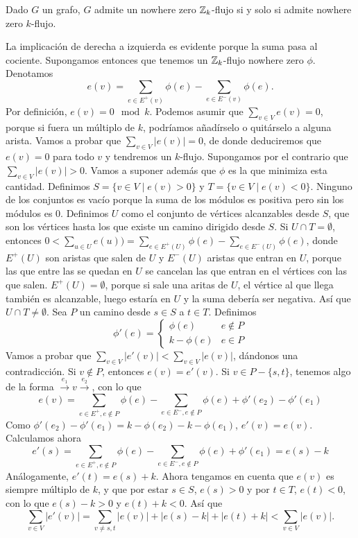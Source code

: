 \documentclass[TGyGC.tex]{subfiles}
\begin{document}
\begin{teorema}
Dado $G$ un grafo, $G$ admite un nowhere zero $\mathbb{Z}_k$-flujo si y solo si admite nowhere zero $k$-flujo.
\end{teorema}
\begin{dem}
La implicación de derecha a izquierda es evidente porque la suma pasa al cociente. Supongamos entonces que tenemos un $\mathbb{Z}_k$-flujo nowhere zero $\phi$. Denotamos $$e(v)=\sum_{e\in E^+(v)}\phi(e)-\sum_{e\in E^-(v)}\phi(e).$$
Por definición, $e(v)=0\mod k$. Podemos asumir que $\sum_{v\in V}e(v)=0$, porque si fuera un múltiplo de $k$, podríamos añadírselo o quitárselo a alguna arista. Vamos a probar que $\sum_{v\in V}|e(v)|=0$, de donde deduciremos que $e(v)=0$ para todo $v$ y tendremos un $k$-flujo. Supongamos por el contrario que $\sum_{v\in V}|e(v)|>0$. Vamos a suponer además que $\phi$ es la que minimiza esta cantidad. Definimos $S=\{v\in V\mid e(v)>0\}$ y $T=\{v\in V\mid e(v)<0\}$. Ninguno de los conjuntos es vacío porque la suma de los módulos es positiva pero sin los módulos es 0. Definimos $U$ como el conjunto de vértices alcanzables desde $S$, que son los vértices hasta los que existe un camino dirigido desde $S$. Si $U\cap T=\emptyset$, entonces $0<\sum_{u\in U}e(u))=\sum_{e\in E^+(U)}\phi(e)-\sum_{e\in E^-(U)}\phi(e)$, donde $E^+(U)$ son aristas que salen de $U$ y $E^-(U)$ aristas que entran en $U$, porque las que entre las se quedan en $U$ se cancelan las que entran en el vértices con las que salen. $E^+(U)=\emptyset$, porque si sale una aritas de $U$, el vértice al que llega también es alcanzable, luego estaría en $U$ y la suma debería ser negativa. Así que $U\cap T\neq\emptyset$. Sea $P$ un camino desde $s\in S$ a $t\in T$. Definimos
\[
\phi'(e)=\begin{cases}
\phi(e) & e\notin P\\
k-\phi(e) & e\in P
\end{cases}
\]
Vamos a probar que $\sum_{v\in V}|e'(v)|<\sum_{v\in V}|e(v)|$, dándonos una contradicción. Si $v\notin P$, entonces $e(v)=e'(v)$. Si $v\in P-\{s,t\}$, tenemos algo de la forma $\xrightarrow{e_1}v\xrightarrow{e_2}$, con lo que $$e(v)=\sum_{e\in E^+,e\notin P}\phi(e)-\sum_{e\in E^-, e\notin P}\phi(e)+\phi'(e_2)-\phi'(e_1)$$
Como $\phi'(e_2)-\phi'(e_1)=k-\phi(e_2)-k-\phi(e_1)$, $e'(v)=e(v)$. Calculamos ahora
\[
e'(s)=\sum_{e\in E^+, e\notin P}\phi(e)-\sum_{e\in E^-, e\notin P}\phi(e)+\phi'(e_1)=e(s)-k
\]
Análogamente, $e'(t)=e(s)+k$. Ahora tengamos en cuenta que $e(v)$ es siempre múltiplo de $k$, y que por estar $s\in S$, $e(s)>0$ y por $t\in T$, $e(t)<0$, con lo que $e(s)-k>0$ y $e(t)+k<0$. Así que
\[
\sum_{v\in V}|e'(v)|=\sum_{v\neq s,t}|e(v)|+|e(s)-k|+|e(t)+k|<\sum_{v\in V}|e(v)|.
\]
\end{dem}
\end{document}
